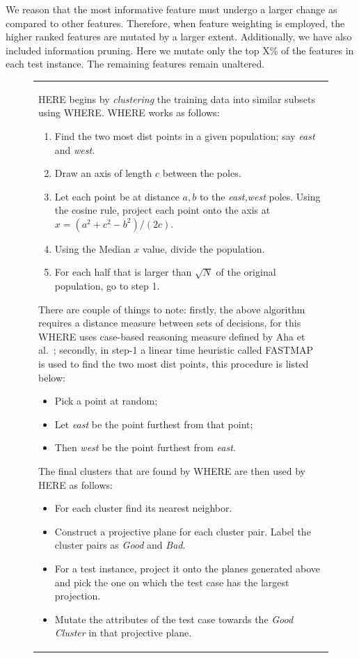 \documentclass[conference]{IEEEtran}
\begin{document}
We reason that the most informative feature must undergo a larger change as compared to other features. Therefore, when feature weighting is employed, the higher ranked features are mutated by a larger extent. Additionally, we have also included information pruning. Here we mutate only the top X\% of the features in each test instance. The remaining features remain unaltered. 
\begin{figure}[htbp!]
\small
\begin{tabular}{|p{.95\linewidth}|}\hline
HERE begins by \textit{clustering} the training data into similar subsets using WHERE. WHERE works as follows:
\begin{enumerate}
\item Find the two most dist points in a given population; say {\em east} and {\em west}. 
\item Draw an axis of length $c$ between the poles. 
\item Let each point be at distance $a,b$ to the {\em east,west} poles.  Using the cosine rule, project each point onto the  axis  at $x=(a^2 + c^2 - b^2)/(2c)$.  
\item Using the Median $x$ value, divide the population.
\item For each half that is larger than $\sqrt{N}$ of the original population, go to step 1.
\end{enumerate}

There are couple of things to note: firstly, the above algorithm requires a distance measure between sets of decisions, for this WHERE uses case-based reasoning measure defined by Aha et al.~\cite{aha91}; secondly, in step-1 a linear time heuristic called FASTMAP~\cite{fastmap} is used to find the two most dist points, this procedure is listed below:
\begin{itemize}
\item Pick a point at random; 
\item Let {\em east} be the point furthest from that point; 
\item Then {\em west} be the point furthest from {\em east}.
\end{itemize}

The final clusters that are found by WHERE are then used by HERE as follows:
\begin{itemize}
\item For each cluster find its nearest neighbor.
\item Construct a projective plane for each cluster pair. Label the cluster pairs as {\em Good} and {\em Bad}.
\item For a test instance, project it onto the planes generated above and pick the one on which the test case has the largest projection.
\item Mutate the attributes of the test case towards the {\em Good Cluster} in that projective plane. 
\end{itemize}


\end{tabular}
\end{figure}
\end{document}
